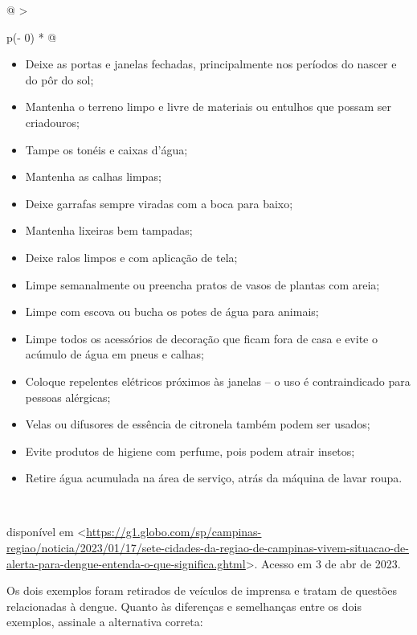 {\begin{longtable}[]{@{}
  >{\raggedright\arraybackslash}p{(\columnwidth - 0\tabcolsep) * }@{}}
\begin{minipage}[t]{\linewidth}
\begin{itemize}
\item
  Deixe as portas e janelas fechadas, principalmente nos períodos do
  nascer e do pôr do sol;
\item
  Mantenha o terreno limpo e livre de materiais ou entulhos que possam
  ser criadouros;
\item
  Tampe os tonéis e caixas d'água;
\item
  Mantenha as calhas limpas;
\item
  Deixe garrafas sempre viradas com a boca para baixo;
\item
  Mantenha lixeiras bem tampadas;
\item
  Deixe ralos limpos e com aplicação de tela;
\item
  Limpe semanalmente ou preencha pratos de vasos de plantas com areia;
\item
  Limpe com escova ou bucha os potes de água para animais;
\item
  Limpe todos os acessórios de decoração que ficam fora de casa e evite
  o acúmulo de água em pneus e calhas;
\item
  Coloque repelentes elétricos próximos às janelas -- o uso é
  contraindicado para pessoas alérgicas;
\item
  Velas ou difusores de essência de citronela também podem ser usados;
\item
  Evite produtos de higiene com perfume, pois podem atrair insetos;
\item
  Retire água acumulada na área de serviço, atrás da máquina de lavar
  roupa.
\end{itemize}
\end{minipage} \\
\bottomrule
\end{longtable}

disponível em
\textless{}\href{https://g1.globo.com/sp/campinas-regiao/noticia/2023/01/17/sete-cidades-da-regiao-de-campinas-vivem-situacao-de-alerta-para-dengue-entenda-o-que-significa.ghtml}{\uline{https://g1.globo.com/sp/campinas-regiao/noticia/2023/01/17/sete-cidades-da-regiao-de-campinas-vivem-situacao-de-alerta-para-dengue-entenda-o-que-significa.ghtml}}\textgreater.
Acesso em 3 de abr de 2023.

Os dois exemplos foram retirados de veículos de imprensa e tratam de
questões relacionadas à dengue. Quanto às diferenças e semelhanças entre
os dois exemplos, assinale a alternativa correta:

}
